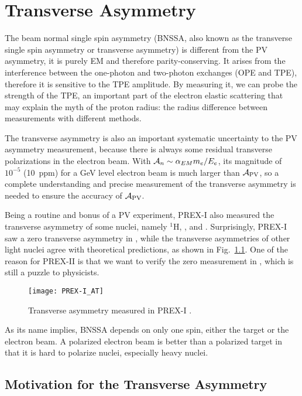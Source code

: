 \chapter{Transverse Asymmetry}
The beam normal single spin asymmetry (BNSSA, also known as the transverse single spin asymmetry
or transverse asymmetry) is different from the PV asymmetry, it is purely 
EM and therefore parity-conserving. It arises from the interference
between the one-photon and two-photon exchanges (OPE and TPE), therefore it is sensitive 
to the TPE amplitude. By measuring it, we can probe the strength of the TPE, an 
important part of the electron elastic scattering that may explain the myth
of the proton radius: the radius difference between measurements with different methods.

The transverse asymmetry is also an important systematic uncertainty to the PV 
asymmetry measurement, because there is always some residual transverse polarizations
in the electron beam. With $\mathcal{A}_n \sim \alpha_{EM}m_e/E_e$, its magnitude of $10^{-5}$ (10~ppm)
for a GeV level electron beam is much larger than $\mathcal{A}_{\text{PV}}$, so a complete 
understanding and precise measurement of the transverse asymmetry is needed
to ensure the accuracy of $\mathcal{A}_{\text{PV}}$.

Being a routine and bonus of a PV experiment, PREX-I also measured the transverse
asymmetry of some nuclei, namely ${}^{1}$H, \He, \Carbon and \Pb. Surprisingly, PREX-I
saw a zero transverse asymmetry in \Pb, while the transverse asymmetries of other 
light nuclei agree with theoretical predictions, as shown in 
Fig.~\ref{fig:PREX-I_AT}. One of the reason for PREX-II is that we want to
verify the zero measurement in \Pb, which is still a puzzle to physicists.
\begin{figure}[!h]
    \centering
    \texttt{[image: PREX-I\_AT]}
    \caption{Transverse asymmetry measured in PREX-I \cite{PhysRevLett.109.192501}.}
    \label{fig:PREX-I_AT}
\end{figure}

As its name implies, BNSSA depends on only one spin, either the target or the
electron beam. A polarized electron beam is better than a polarized target in that 
it is hard to polarize nuclei, especially heavy nuclei.

\section{Motivation for the Transverse Asymmetry}

